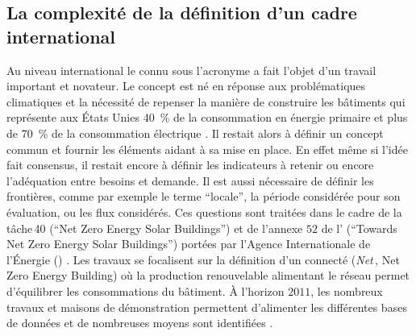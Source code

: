 \subsection{La complexité de la définition d’un cadre international} %
\label{sub:la_definition_d_un_cadre_international}
Au niveau international le  connu sous l’acronyme  a fait l’objet d’un
travail important et novateur. Le concept est né en réponse aux problématiques climatiques
et la nécessité de repenser la manière de construire les bâtiments qui représente aux
États Unies \SI{40}{\percent} de la consommation en énergie primaire et plus de
\SI{70}{\percent} de la consommation électrique \parencite{Torcellini2006a}. Il restait
alors à définir un concept commun et fournir les éléments aidant à sa mise en place. En
effet même si l’idée fait consensus, il restait encore à définir les indicateurs à retenir
ou encore l’adéquation entre besoins et demande. Il est aussi nécessaire de définir les
frontières, comme par exemple le terme \enquote{locale}, la période considérée pour son
évaluation, ou les flux considérés. Ces questions sont traitées dans le cadre de la
tâche\,40 (\enquote{Net Zero Energy Solar Buildings}) et de l’annexe $52$ de l’
(\enquote{Towards Net Zero Energy Solar Buildings}) portées par l’Agence Internationale de
l’Énergie () \parencite{Athienitis2015}. Les travaux se focalisent sur la
définition d’un  connecté (\textit{Net}\,, Net Zero Energy Building)
où la production renouvelable alimentant le réseau permet d’équilibrer les consommations
du bâtiment. À l’horizon $2011$, les nombreux travaux et maisons de démonstration
permettent d’alimenter les différentes bases de données et de nombreuses moyens sont
identifiées \parencite{Marszal2011971}.


